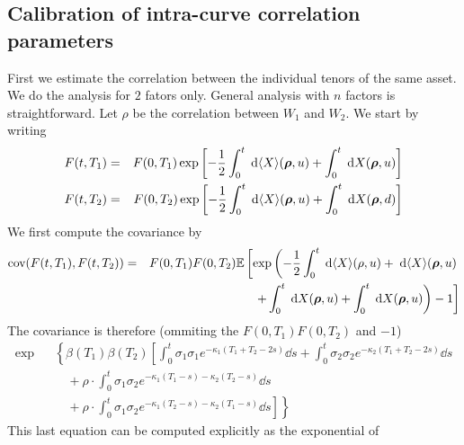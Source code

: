 \documentclass[12pt]{article}
\begin{document}
\subsection {Calibration of intra-curve correlation parameters}
\label {correlation_calibration_section}

First we estimate the correlation between the individual tenors of the 
same asset. We do the analysis for $2$ fators only. General analysis with 
$n$ factors is straightforward. Let $\rho$ be the correlation between 
$W_1$ and $W_2$. We start by writing 
\begin {eqnarray*}
  F(t,T_1) & = & F(0,T_1) \exp \left[
    - \frac 1 2 \int_0^t \; \mbox {{\rm d}} \langle X\rangle (\mbox {\boldmath ${\rho }$}, u) + \int_0^t \; \mbox {{\rm d}} X 
    (\mbox {\boldmath ${ \rho}$}, u)
    \right]
  \\
  F(t,T_2) & = & F(0,T_2) \exp \left[
    - \frac 1 2 \int_0^t \; \mbox {{\rm d}} \langle X \rangle ( \mbox {\boldmath ${ \rho }$}, u) + 
    \int_0^t \; \mbox {{\rm d}} X ( \mbox {\boldmath ${\rho}$} , d)
    \right]
\end {eqnarray*}
We first compute the covariance by 
\begin {eqnarray*}
  \textrm {cov} (F (t,T_1), F(t,T_2) ) & = & 
  F (0,T_1) F(0,T_2) \mathbb {E} \left[ 
    \exp \left( 
    - \frac 1 2 \int_0^t \; \mbox {{\rm d}} \langle X \rangle (\rho, u) + 
    \; \mbox {{\rm d}} \langle X \rangle ( \mbox {\boldmath ${\rho}$}, u) 
    \right. \right.
    \\
    &  & \quad \left. \left.
    + \int_0^t \; \mbox {{\rm d}} X ( \mbox {\boldmath ${ \rho }$}, u)
    + \int_0^t \; \mbox {{\rm d}} X ( \mbox {\boldmath ${\rho}$}, u)
    \right) - 1
    \right]
\end {eqnarray*}
The covariance is therefore (ommiting the $F(0,T_1) F(0,T_2)$ and $-1$)
\begin {eqnarray*}
  \exp &  & \left\{ \beta(T_1) \beta(T_2) \left[
    \int_0^t \sigma_1 \sigma_1  e^{ -\kappa_1 (T_1 + T_2 - 2s) } \dd s
    + 
    \int_0^t \sigma_2 \sigma_2 e^{ -\kappa_2 (T_1 + T_2 - 2s) } \dd s
    \right. \right.
    \\
    &  & 
    \quad + 
    \rho \cdot 
    \int_0^t \sigma_1 \sigma_2 e^{ -\kappa_1 (T_1 - s) - \kappa_2 (T_2 - s) } \dd s
    \\
    &  & \left. \left. \quad 
    +
    \rho \cdot 
    \int_0^t \sigma_1 \sigma_2 e^{ -\kappa_1 (T_2 - s) - \kappa_2 (T_1 - s) } \dd s
    \right] \right\}
\end {eqnarray*}
This last equation can be computed explicitly as the exponential of 
\end{document}
